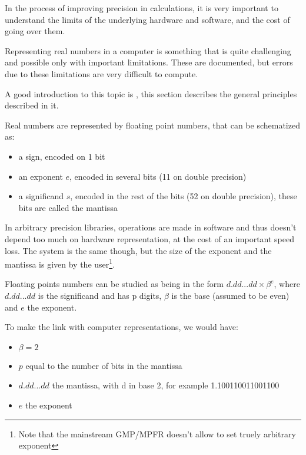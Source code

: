 
In the process of improving precision in calculations, it is very important to understand the limits of the underlying hardware and software, and the cost of going over them.


Representing real numbers in a computer is something that is quite challenging and possible only with important limitations. These are documented, but errors due to these limitations are very difficult to compute.

A good introduction to this topic is \cite{Goldberg}, this section describes the general principles described in it.



Real numbers are represented by floating point numbers, that can be schematized as:
\begin{itemize}
\item a sign, encoded on 1 bit
\item an exponent $e$, encoded in several bits (11 on double precision)
\item a significand $s$, encoded in the rest of the bits (52 on double precision), these bits are called the mantissa
\end{itemize}

In arbitrary precision libraries, operations are made in software and thus doesn't depend too much on hardware representation, at the cost of an important speed loss. The system is the same though, but the size of the exponent and the mantissa is given by the user\footnote{Note that the mainstream GMP/MPFR doesn't allow to set truely arbitrary exponent}.


Floating points numbers can be studied as being in the form $d.dd...dd\times\beta^e$, where $d.dd...dd$ is the significand and has p digits, $\beta$ is the base (assumed to be even) and $e$ the exponent.

To make the link with computer representations, we would have:
\begin{itemize}
\item $\beta=2$
\item $p$ equal to the number of bits in the mantissa
\item $d.dd...dd$ the mantissa, with d in base 2, for example 1.100110011001100
\item $e$ the exponent
\end{itemize}

